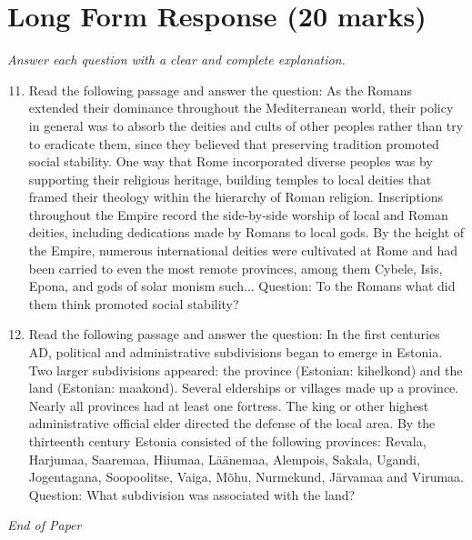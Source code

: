 \documentclass[12pt]{article}
\begin{document}
\section*{Long Form Response (20 marks)}
\textit{Answer each question with a clear and complete explanation.}
\begin{enumerate}[label=\arabic*.]
\setcounter{enumi}{10}
\item Read the following passage and answer the question: As the Romans extended their dominance throughout the Mediterranean world, their policy in general was to absorb the deities and cults of other peoples rather than try to eradicate them, since they believed that preserving tradition promoted social stability. One way that Rome incorporated diverse peoples was by supporting their religious heritage, building temples to local deities that framed their theology within the hierarchy of Roman religion. Inscriptions throughout the Empire record the side-by-side worship of local and Roman deities, including dedications made by Romans to local gods. By the height of the Empire, numerous international deities were cultivated at Rome and had been carried to even the most remote provinces, among them Cybele, Isis, Epona, and gods of solar monism such... Question: To the Romans what did them think promoted social stability?
\item Read the following passage and answer the question: In the first centuries AD, political and administrative subdivisions began to emerge in Estonia. Two larger subdivisions appeared: the province (Estonian: kihelkond) and the land (Estonian: maakond). Several elderships or villages made up a province. Nearly all provinces had at least one fortress. The king or other highest administrative official elder directed the defense of the local area. By the thirteenth century Estonia consisted of the following provinces: Revala, Harjumaa, Saaremaa, Hiiumaa, Läänemaa, Alempois, Sakala, Ugandi, Jogentagana, Soopoolitse, Vaiga, Mõhu, Nurmekund, Järvamaa and Virumaa. Question: What subdivision was associated with the land?
\end{enumerate}

\vfill
\noindent\textit{End of Paper}
\end{document}
